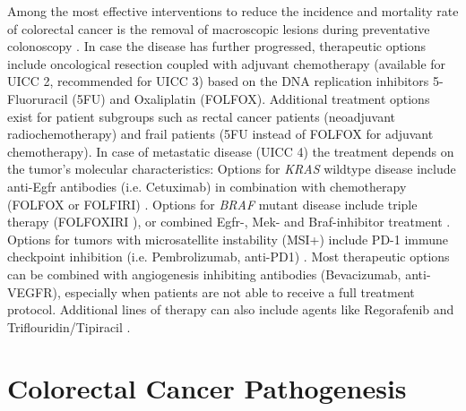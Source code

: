 \begin{flushleft}
Among the most effective interventions to reduce the incidence and mortality rate of colorectal cancer is the removal of macroscopic lesions during preventative colonoscopy \parencite{nishiharaLongtermColorectalcancerIncidence2013}. In case the disease has further progressed, therapeutic options include oncological resection coupled with adjuvant chemotherapy (available for UICC 2, recommended for UICC 3) based on the DNA replication inhibitors 5-Fluoruracil (5FU) and Oxaliplatin (FOLFOX). Additional treatment options exist for patient subgroups such as rectal cancer patients (neoadjuvant radiochemotherapy) and frail patients (5FU instead of FOLFOX for adjuvant chemotherapy). In case of metastatic disease (UICC 4) the treatment depends on the tumor's molecular characteristics: Options for \textit{KRAS} wildtype disease include anti-Egfr antibodies (i.e. Cetuximab) in combination with chemotherapy (FOLFOX or FOLFIRI) \parencite{vancutsemESMOConsensusGuidelines2016a}. Options for \textit{BRAF} mutant disease include triple therapy (FOLFOXIRI \parencite{vancutsemESMOConsensusGuidelines2016a}), or combined Egfr-, Mek- and Braf-inhibitor treatment \parencite{kopetzEncorafenibBinimetinibCetuximab2019}. Options for tumors with microsatellite instability (MSI+) include PD-1 immune checkpoint inhibition (i.e. Pembrolizumab, anti-PD1) \parencite{andrePembrolizumabMicrosatelliteInstabilityHighAdvanced2020}. Most therapeutic options can be combined with angiogenesis inhibiting antibodies (Bevacizumab, anti-VEGFR), especially when patients are not able to receive a full treatment protocol. Additional lines of therapy can also include agents like Regorafenib and Triflouridin/Tipiracil \parencite{vancutsemESMOConsensusGuidelines2016a}. 
\par

\section{Colorectal Cancer Pathogenesis}


\end{flushleft}
